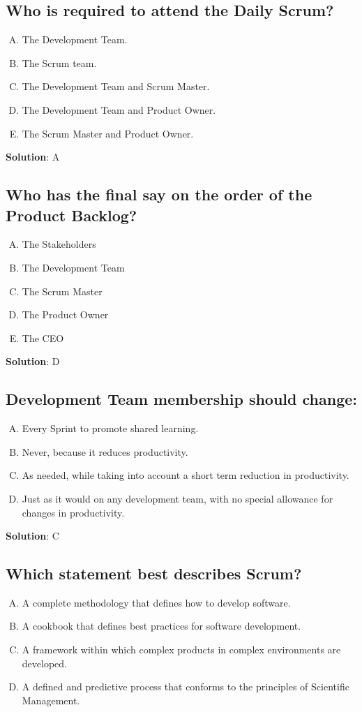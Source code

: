 \subsection{Who is required to attend the Daily Scrum?}
\begin{enumerate}[A)]
  \item The Development Team.
  \item The Scrum team.
  \item The Development Team and Scrum Master.
  \item The Development Team and Product Owner.
  \item The Scrum Master and Product Owner.
\end{enumerate}


\textbf{Solution}: A


\subsection{Who has the final say on the order of the Product Backlog?}
\begin{enumerate}[A)]
  \item The Stakeholders
  \item The Development Team
  \item The Scrum Master
  \item The Product Owner
  \item The CEO
\end{enumerate}


\textbf{Solution}: D


\subsection{Development Team membership should change:}
\begin{enumerate}[A)]
  \item Every Sprint to promote shared learning.
  \item Never, because it reduces productivity.
  \item As needed, while taking into account a short term reduction in productivity.
  \item Just as it would on any development team, with no special allowance for changes in productivity.
\end{enumerate}


\textbf{Solution}: C


\subsection{Which statement best describes Scrum?}
\begin{enumerate}[A)]
  \item A complete methodology that defines how to develop software.
  \item A cookbook that defines best practices for software development.
  \item A framework within which complex products in complex environments are developed.
  \item A defined and predictive process that conforms to the principles of Scientific Management.
\end{enumerate}


